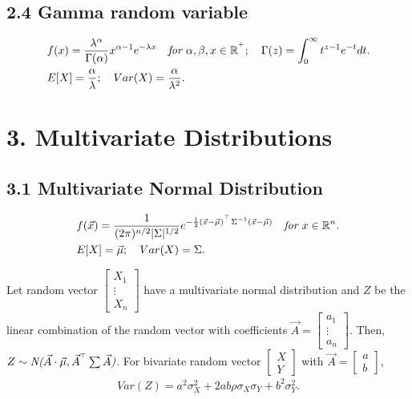 \documentclass{article}
\begin{document}
\subsection*{2.4 Gamma random variable}
\begin{align}
    & f(x) = \frac{\lambda^{\alpha}}{\Gamma(\alpha)} x^{\alpha-1} e^{-\lambda x} \quad \emph{for $\alpha, \beta, x\in \mathbb{R}^{^+}$}; \quad \Gamma(z) = \int_0^\infty t^{z-1}e^{-t}dt. \nonumber \\
    & E[X] = \frac{\alpha}{\lambda}; \quad Var(X) = \frac{\alpha}{\lambda^2}. \nonumber
\end{align}

\newpage
\section*{3. Multivariate Distributions}
\subsection*{3.1 Multivariate Normal Distribution}
\begin{align}
    & f(\vec{x}) = \frac{1}{(2\pi)^{n/2}|\Sigma|^{1/2}} e^{-\frac{1}{2}(\vec{x}-\vec{\mu})^{^\top}\Sigma^{-1}(\vec{x}-\vec{\mu})} \quad \emph{for $x\in \mathbb{R}^n$}. \nonumber \\
    & E[X] = \vec{\mu}; \quad Var(X) = \Sigma. \nonumber
\end{align}

Let random vector $\begin{bmatrix} X_1 \\ \vdots \\ X_n \end{bmatrix}$ have a multivariate normal distribution and $Z$ be the linear combination of the random vector with coefficients $\vec{A} = \begin{bmatrix}
    a_1 \\ 
    \vdots \\
    a_n
\end{bmatrix}$.
Then, $Z\sim \emph{N($\vec{A}\cdot \vec{\mu},\vec{A}^{^\top}\sum\vec{A}$)}$.
For bivariate random vector $\begin{bmatrix}
    X \\ Y
\end{bmatrix}$ with $\vec{A} = \begin{bmatrix}
    a \\ b
\end{bmatrix}$,
\begin{align}
    Var(Z) = a^2\sigma_X^2+2ab\rho\sigma_X\sigma_Y+b^2\sigma_Y^2. \nonumber
\end{align}
\end{document}

